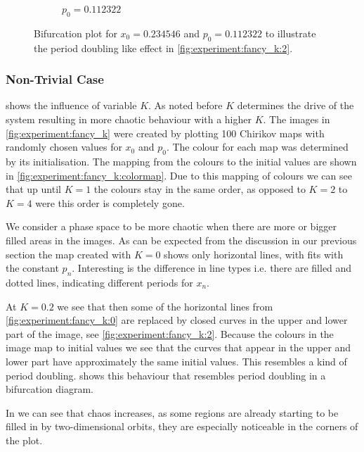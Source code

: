 \begin{figure}[ht]
\begin{subfigure}{\columnwidth}
			\caption{$p_0 = \num{0.112322}$}
			\label{fig:experiment:bifurcation:p}
	\end{subfigure}
	\caption{Bifurcation plot for $x_0 = \num{0.234546}$ and $p_0 = \num{0.112322}$ to illustrate the period doubling like effect in \cref{fig:experiment:fancy_k:2}.}
	\label{fig:experiment:bifurcation}
\end{figure}

\subsubsection{Non-Trivial Case}
\label{ss:b:nontrivial}
 shows the influence of variable $K$. As noted before $K$ determines the drive of the system resulting in more chaotic behaviour with a higher $K$. The images in \cref{fig:experiment:fancy_k} were created by plotting 100 Chirikov maps with randomly chosen values for $x_0$ and $p_0$. The colour for each map was determined by its initialisation. The mapping from the colours to the initial values are shown in \cref{fig:experiment:fancy_k:colormap}. Due to this mapping of colours we can see that up until $K = 1$ the colours stay in the same order, as opposed to $K = 2$ to $K = 4$ were this order is completely gone.

We consider a phase space to be more chaotic when there are more or bigger filled areas in the images. As can be expected from the discussion in our previous section the map created with $K = 0$ shows only horizontal lines, with fits with the constant $p_n$. Interesting is the difference in line types i.e. there are filled and dotted lines, indicating different periods for $x_n$. 

At $K = 0.2$ we see that then some of the horizontal lines from \cref{fig:experiment:fancy_k:0} are replaced by closed curves in the upper and lower part of the image, see \cref{fig:experiment:fancy_k:2}. Because the colours in the image map to initial values we see that the curves that appear in the upper and lower part have approximately the same initial values. This resembles a kind of period doubling.  shows this behaviour that resembles period doubling in a bifurcation diagram.

In  we can see that chaos increases, as some regions are already starting to be filled in by two-dimensional orbits, they are especially  noticeable in the corners of the plot.

